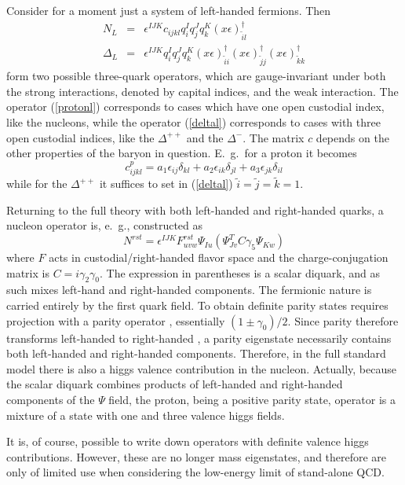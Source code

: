 \documentclass[final,12pt,3p,longtitle]{elsarticle}
\newcommand*{\no}{\noindent}
\newcommand*{\bea}{\begin{eqnarray}}
\newcommand*{\eea}{\end{eqnarray}}
\newcommand*{\be}{\begin{equation}}
\newcommand*{\ee}{\end{equation}}
\newcommand*{\pref}[1]{(\ref{#1})}
\newcommand*{\nn}{\nonumber}
\newcommand*{\1}{1\!\!\!\bot}
\begin{document}
Consider for a moment just a system of left-handed fermions. Then \cite{Egger:2017tkd}
\bea
N_L&=&\epsilon^{IJK} c_{ijkl} q_i^I q_j^J q_k^K (x\epsilon)^{\dagger}_{\tilde{i}l}\label{protonl}\\
\Delta_L&=&\epsilon^{IJK} q_i^I q_j^J q_k^K (x\epsilon)^{\dagger}_{\tilde{i}i} (x\epsilon)^{\dagger}_{\tilde{j}j} (x\epsilon)^{\dagger}_{\tilde{k}k}\label{deltal}
\eea
\no form two possible three-quark operators, which are gauge-invariant under both the strong interactions, denoted by capital indices, and the weak interaction. The operator \pref{protonl} corresponds to cases which have one open custodial index, like the nucleons, while the operator \pref{deltal} corresponds to cases with three open custodial indices, like the $\Delta^{++}$ and the $\Delta^{-}$. The matrix $c$ depends on the other properties of the baryon in question. E.\ g.\ for a proton it becomes \cite{Egger:2017tkd}
\be
c_{ijkl}^p=a_1\epsilon_{ij}\delta_{kl} + a_2\epsilon_{ik}\delta_{jl} + a_3\epsilon_{jk}\delta_{il}\nn
\ee
\no while for the $\Delta^{++}$ it suffices to set in \pref{deltal} $\tilde{i}=\tilde{j}=\tilde{k}=1$.

Returning to the full theory with both left-handed and right-handed quarks, a nucleon operator is, e.\ g., constructed as \cite{Gattringer:2010zz}
\be
N^{rst}=\epsilon^{IJK}F^{rst}_{uvw}\Psi_{Iu}\left(\Psi^T_{Jv}C\gamma_5\Psi_{Kw}\right)\label{nucleon}
\ee
\no where $F$ acts in custodial/right-handed flavor space and the charge-conjugation matrix is $C=i\gamma_2\gamma_0$. The expression in parentheses is a scalar diquark, and as such mixes left-hand and right-handed components. The fermionic nature is carried entirely by the first quark field. To obtain definite parity states requires projection with a parity operator \cite{Gattringer:2010zz}, essentially $(1\pm\gamma_0)/2$. Since parity therefore transforms left-handed to right-handed \cite{Itzykson:1980rh}, a parity eigenstate necessarily contains both left-handed and right-handed components. Therefore, in the full standard model there is also a higgs valence contribution in the nucleon. Actually, because the scalar diquark combines products of left-handed and right-handed components of the $\Psi$ field, the proton, being a positive parity state, operator is a mixture of a state with one and three valence higgs fields.

It is, of course, possible to write down operators with definite valence higgs contributions. However, these are no longer mass eigenstates, and therefore are only of limited use when considering the low-energy limit of stand-alone QCD.
\end{document}
